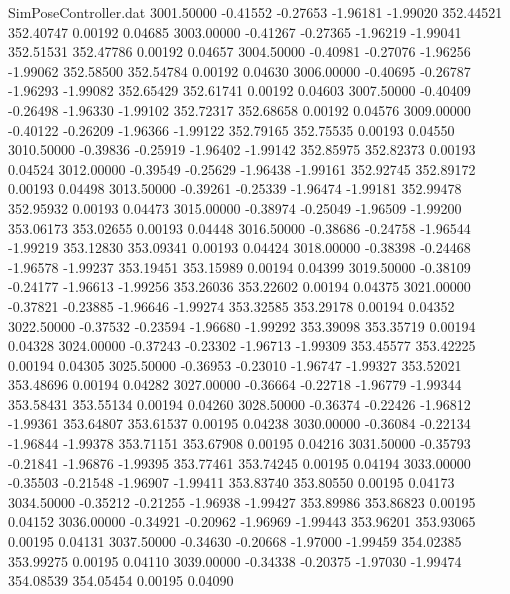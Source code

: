 \begin{filecontents}{SimPoseController.dat}
3001.50000   -0.41552   -0.27653    -1.96181   -1.99020  352.44521  352.40747    0.00192    0.04685
3003.00000   -0.41267   -0.27365    -1.96219   -1.99041  352.51531  352.47786    0.00192    0.04657
3004.50000   -0.40981   -0.27076    -1.96256   -1.99062  352.58500  352.54784    0.00192    0.04630
3006.00000   -0.40695   -0.26787    -1.96293   -1.99082  352.65429  352.61741    0.00192    0.04603
3007.50000   -0.40409   -0.26498    -1.96330   -1.99102  352.72317  352.68658    0.00192    0.04576
3009.00000   -0.40122   -0.26209    -1.96366   -1.99122  352.79165  352.75535    0.00193    0.04550
3010.50000   -0.39836   -0.25919    -1.96402   -1.99142  352.85975  352.82373    0.00193    0.04524
3012.00000   -0.39549   -0.25629    -1.96438   -1.99161  352.92745  352.89172    0.00193    0.04498
3013.50000   -0.39261   -0.25339    -1.96474   -1.99181  352.99478  352.95932    0.00193    0.04473
3015.00000   -0.38974   -0.25049    -1.96509   -1.99200  353.06173  353.02655    0.00193    0.04448
3016.50000   -0.38686   -0.24758    -1.96544   -1.99219  353.12830  353.09341    0.00193    0.04424
3018.00000   -0.38398   -0.24468    -1.96578   -1.99237  353.19451  353.15989    0.00194    0.04399
3019.50000   -0.38109   -0.24177    -1.96613   -1.99256  353.26036  353.22602    0.00194    0.04375
3021.00000   -0.37821   -0.23885    -1.96646   -1.99274  353.32585  353.29178    0.00194    0.04352
3022.50000   -0.37532   -0.23594    -1.96680   -1.99292  353.39098  353.35719    0.00194    0.04328
3024.00000   -0.37243   -0.23302    -1.96713   -1.99309  353.45577  353.42225    0.00194    0.04305
3025.50000   -0.36953   -0.23010    -1.96747   -1.99327  353.52021  353.48696    0.00194    0.04282
3027.00000   -0.36664   -0.22718    -1.96779   -1.99344  353.58431  353.55134    0.00194    0.04260
3028.50000   -0.36374   -0.22426    -1.96812   -1.99361  353.64807  353.61537    0.00195    0.04238
3030.00000   -0.36084   -0.22134    -1.96844   -1.99378  353.71151  353.67908    0.00195    0.04216
3031.50000   -0.35793   -0.21841    -1.96876   -1.99395  353.77461  353.74245    0.00195    0.04194
3033.00000   -0.35503   -0.21548    -1.96907   -1.99411  353.83740  353.80550    0.00195    0.04173
3034.50000   -0.35212   -0.21255    -1.96938   -1.99427  353.89986  353.86823    0.00195    0.04152
3036.00000   -0.34921   -0.20962    -1.96969   -1.99443  353.96201  353.93065    0.00195    0.04131
3037.50000   -0.34630   -0.20668    -1.97000   -1.99459  354.02385  353.99275    0.00195    0.04110
3039.00000   -0.34338   -0.20375    -1.97030   -1.99474  354.08539  354.05454    0.00195    0.04090

\end{filecontents}
